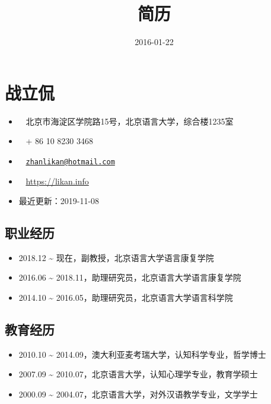 \documentclass[12pt,]{article}
\title{简历}
\author{}
\date{2016-01-22}
\providecommand{\tightlist}{%
  \setlength{\itemsep}{0pt}\setlength{\parskip}{0pt}}
\begin{document}
\maketitle

\hypertarget{ux6218ux7acbux4f83}{%
\section{战立侃}\label{ux6218ux7acbux4f83}}

\begin{itemize}
\tightlist
\item
  \faUniversity ~ 北京市海淀区学院路15号，北京语言大学，综合楼1235室
\item
  \faPhone* ~ + 86 10 8230 3468
\item
  \faEnvelope[regular] ~
  \href{mailto:zhanlikan@hotmail.com}{\nolinkurl{zhanlikan@hotmail.com}}
\item
  \faGlobe ~ \url{https://likan.info}
\item
  最近更新：2019-11-08
\end{itemize}

\hypertarget{ux804cux4e1aux7ecfux5386}{%
\subsection{职业经历}\label{ux804cux4e1aux7ecfux5386}}

\begin{itemize}
\item
  2018.12 \textasciitilde{} 现在，副教授，北京语言大学语言康复学院
\item
  2016.06 \textasciitilde{}
  2018.11，助理研究员，北京语言大学语言康复学院
\item
  2014.10 \textasciitilde{} 2016.05，助理研究员，北京语言大学语言科学院
\end{itemize}

\hypertarget{ux6559ux80b2ux7ecfux5386}{%
\subsection{教育经历}\label{ux6559ux80b2ux7ecfux5386}}

\begin{itemize}
\item
  2010.10 \textasciitilde{}
  2014.09，澳大利亚麦考瑞大学，认知科学专业，哲学博士
\item
  2007.09 \textasciitilde{}
  2010.07，北京语言大学，认知心理学专业，教育学硕士
\item
  2000.09 \textasciitilde{}
  2004.07，北京语言大学，对外汉语教学专业，文学学士
\end{itemize}
\end{document}
